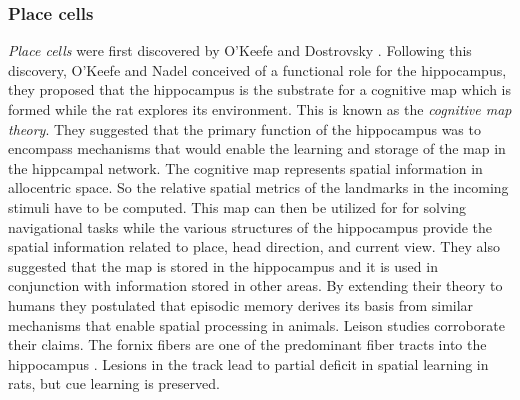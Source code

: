 \subsubsection{Place cells}
\label{placeCells}
 \emph{Place cells} were first discovered by O'Keefe and Dostrovsky \cite{O'Keefe1971a}. Following this discovery, O'Keefe and Nadel \cite{Street}  conceived of a functional role for the hippocampus, they proposed that the hippocampus is the substrate for a cognitive map which is formed while the rat explores its environment. This is known as the \emph{cognitive map theory}. They suggested that the primary function of the hippocampus was to encompass mechanisms that would enable the learning and storage of the map in the hippcampal network. The cognitive map represents spatial information in allocentric space. So the relative spatial metrics of the landmarks in the incoming stimuli have to be computed. This map can then be utilized for for solving navigational tasks while the various structures of the hippocampus provide the spatial information related to place, head direction, and current view. They also suggested that the map is stored in the hippocampus and it is used in conjunction with information stored in other areas. By extending their theory to humans they postulated that episodic memory derives its basis from similar mechanisms that enable spatial processing in animals. Leison studies corroborate their claims. The fornix fibers are one of the predominant fiber tracts into the hippocampus . Lesions in the track lead to partial deficit in spatial learning in rats, but cue learning is preserved.   \\

